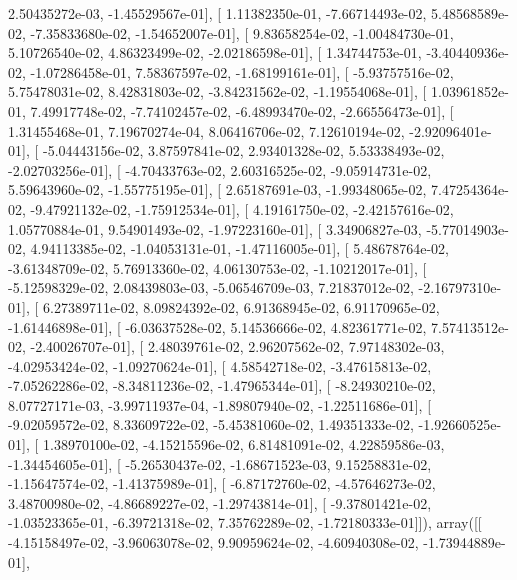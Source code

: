 \documentclass{article}
\begin{document}
          2.50435272e-03,  -1.45529567e-01],
       [  1.11382350e-01,  -7.66714493e-02,   5.48568589e-02,
         -7.35833680e-02,  -1.54652007e-01],
       [  9.83658254e-02,  -1.00484730e-01,   5.10726540e-02,
          4.86323499e-02,  -2.02186598e-01],
       [  1.34744753e-01,  -3.40440936e-02,  -1.07286458e-01,
          7.58367597e-02,  -1.68199161e-01],
       [ -5.93757516e-02,   5.75478031e-02,   8.42831803e-02,
         -3.84231562e-02,  -1.19554068e-01],
       [  1.03961852e-01,   7.49917748e-02,  -7.74102457e-02,
         -6.48993470e-02,  -2.66556473e-01],
       [  1.31455468e-01,   7.19670274e-04,   8.06416706e-02,
          7.12610194e-02,  -2.92096401e-01],
       [ -5.04443156e-02,   3.87597841e-02,   2.93401328e-02,
          5.53338493e-02,  -2.02703256e-01],
       [ -4.70433763e-02,   2.60316525e-02,  -9.05914731e-02,
          5.59643960e-02,  -1.55775195e-01],
       [  2.65187691e-03,  -1.99348065e-02,   7.47254364e-02,
         -9.47921132e-02,  -1.75912534e-01],
       [  4.19161750e-02,  -2.42157616e-02,   1.05770884e-01,
          9.54901493e-02,  -1.97223160e-01],
       [  3.34906827e-03,  -5.77014903e-02,   4.94113385e-02,
         -1.04053131e-01,  -1.47116005e-01],
       [  5.48678764e-02,  -3.61348709e-02,   5.76913360e-02,
          4.06130753e-02,  -1.10212017e-01],
       [ -5.12598329e-02,   2.08439803e-03,  -5.06546709e-03,
          7.21837012e-02,  -2.16797310e-01],
       [  6.27389711e-02,   8.09824392e-02,   6.91368945e-02,
          6.91170965e-02,  -1.61446898e-01],
       [ -6.03637528e-02,   5.14536666e-02,   4.82361771e-02,
          7.57413512e-02,  -2.40026707e-01],
       [  2.48039761e-02,   2.96207562e-02,   7.97148302e-03,
         -4.02953424e-02,  -1.09270624e-01],
       [  4.58542718e-02,  -3.47615813e-02,  -7.05262286e-02,
         -8.34811236e-02,  -1.47965344e-01],
       [ -8.24930210e-02,   8.07727171e-03,  -3.99711937e-04,
         -1.89807940e-02,  -1.22511686e-01],
       [ -9.02059572e-02,   8.33609722e-02,  -5.45381060e-02,
          1.49351333e-02,  -1.92660525e-01],
       [  1.38970100e-02,  -4.15215596e-02,   6.81481091e-02,
          4.22859586e-03,  -1.34454605e-01],
       [ -5.26530437e-02,  -1.68671523e-03,   9.15258831e-02,
         -1.15647574e-02,  -1.41375989e-01],
       [ -6.87172760e-02,  -4.57646273e-02,   3.48700980e-02,
         -4.86689227e-02,  -1.29743814e-01],
       [ -9.37801421e-02,  -1.03523365e-01,  -6.39721318e-02,
          7.35762289e-02,  -1.72180333e-01]]), array([[ -4.15158497e-02,  -3.96063078e-02,   9.90959624e-02,
         -4.60940308e-02,  -1.73944889e-01],
\end{document}
